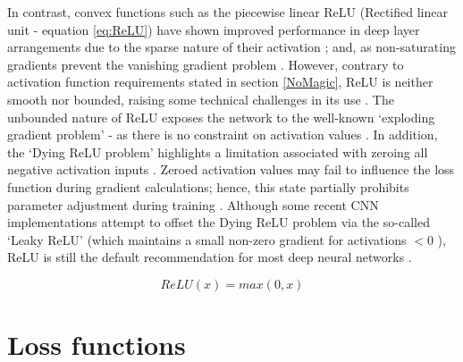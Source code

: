 In contrast, convex functions such as the piecewise linear ReLU (Rectified linear unit - equation \ref{eq:ReLU}) have shown improved performance in deep layer arrangements due to the sparse nature of their activation \cite{Krizhevsky2012}; and, as non-saturating gradients prevent the vanishing gradient problem \cite{Lundervold2019}. However, contrary to activation function requirements stated in section \ref{NoMagic}, ReLU is neither smooth nor bounded, raising some technical challenges in its use \cite{Lundervold2019}. The unbounded nature of ReLU exposes the network to the well-known `exploding gradient problem' - as there is no constraint on activation values \cite{xu2015}. In addition, the `Dying ReLU problem' highlights a limitation associated with zeroing all negative activation inputs \cite{xu2015}. Zeroed activation values may fail to influence the loss function during gradient calculations; hence, this state partially prohibits parameter adjustment during training \cite{xu2015}. Although some recent CNN implementations attempt to offset the Dying ReLU problem via the so-called `Leaky ReLU' (which maintains a small non-zero gradient for activations $< 0$ \cite{Maas2013}), ReLU is still the default recommendation for most deep neural networks \cite{Goodfellow2016}.

\begin{equation}
ReLU(x) = max(0,x)
\label{eq:ReLU}
\end{equation}


\section{Loss functions}




